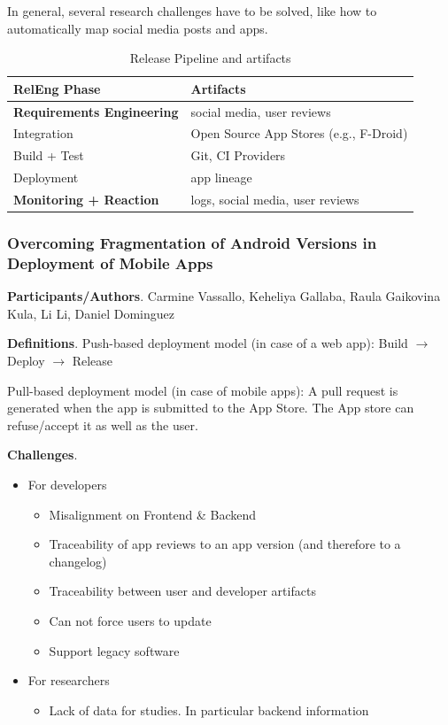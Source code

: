 \documentclass[a4paper]{article}
\newcommand{\smallsection}[1]{\noindent \textbf{#1}. }
\begin{document}
In general, several research challenges have to be solved, like how to automatically map social media posts and apps.

\begin{table}[h] \label{table:release}
    \centering
    \caption{Release Pipeline and artifacts}
    \begin{tabular}{l|l}
        \hline
        RelEng Phase & Artifacts \\ \hline 
        \textbf{Requirements Engineering} & social media, user         reviews \\ 
        Integration & Open Source App Stores (e.g., F-Droid) \\
        Build + Test & Git, CI Providers \\
        Deployment & app lineage \\
        \textbf{Monitoring + Reaction} & logs, social media, user
        reviews  \\ \hline
    \end{tabular}
\end{table}

\subsubsection{Overcoming Fragmentation of Android Versions in Deployment of Mobile Apps}

\smallsection{Participants/Authors} Carmine Vassallo, Keheliya Gallaba, Raula Gaikovina Kula, Li Li, Daniel Dominguez

\smallsection{Definitions} Push-based deployment model (in case of a web app): Build $\rightarrow$ Deploy $\rightarrow$ Release

Pull-based deployment model (in case of mobile apps): A pull request is generated when the app is submitted to the App Store. The App store can refuse/accept it as well as the user.

\smallsection{Challenges} 

\begin{itemize}
    \tightlist
    \item For developers
        \begin{itemize}
            \tightlist
            \item Misalignment on Frontend \& Backend
            \item Traceability of app reviews to an app version (and therefore to a changelog)
            \item Traceability between user and developer artifacts
            \item Can not force users to update
            \item Support legacy software
        \end{itemize}
    \item For researchers
        \begin{itemize}
            \tightlist
            \item Lack of data for studies. In particular backend information
        \end{itemize}
\end{itemize}
\end{document}
